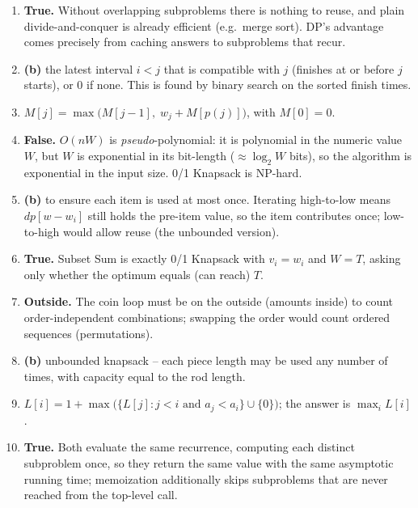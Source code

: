 \documentclass[11pt]{article}
\begin{document}
\begin{enumerate}[label=\textbf{B\arabic*.}, leftmargin=2.2em]

\item \textbf{True.} Without overlapping subproblems there is nothing to reuse, and plain
divide-and-conquer is already efficient (e.g.\ merge sort). DP's advantage comes precisely
from caching answers to subproblems that recur.

\item \textbf{(b)} the latest interval $i < j$ that is compatible with $j$ (finishes at or
before $j$ starts), or $0$ if none. This is found by binary search on the sorted finish
times.

\item $M[j] = \max\bigl(M[j-1],\; w_j + M[p(j)]\bigr)$, with $M[0] = 0$.

\item \textbf{False.} $O(nW)$ is \emph{pseudo}-polynomial: it is polynomial in the numeric
value $W$, but $W$ is exponential in its bit-length ($\approx \log_2 W$ bits), so the
algorithm is exponential in the input size. 0/1 Knapsack is NP-hard.

\item \textbf{(b)} to ensure each item is used at most once. Iterating high-to-low means
$\mathit{dp}[w - w_i]$ still holds the pre-item value, so the item contributes once;
low-to-high would allow reuse (the unbounded version).

\item \textbf{True.} Subset Sum is exactly 0/1 Knapsack with $v_i = w_i$ and $W = T$,
asking only whether the optimum equals (can reach) $T$.

\item \textbf{Outside.} The coin loop must be on the outside (amounts inside) to count
order-independent combinations; swapping the order would count ordered sequences
(permutations).

\item \textbf{(b)} unbounded knapsack -- each piece length may be used any number of times,
with capacity equal to the rod length.

\item $L[i] = 1 + \max\bigl(\{L[j] : j < i \text{ and } a_j < a_i\} \cup \{0\}\bigr)$; the
answer is $\max_i L[i]$.

\item \textbf{True.} Both evaluate the same recurrence, computing each distinct subproblem
once, so they return the same value with the same asymptotic running time; memoization
additionally skips subproblems that are never reached from the top-level call.

\end{enumerate}
\end{document}
